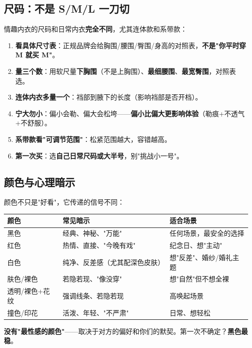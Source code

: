 \documentclass[12pt,UTF8,openany]{ctexbook}
\begin{document}
\subsection*{尺码：不是 S/M/L 一刀切}
情趣内衣的尺码和日常内衣\textbf{完全不同}，尤其连体款和系带款：
\begin{enumerate}[leftmargin=2em,itemsep=0.2em]
  \item \textbf{看具体尺寸表}：正规品牌会给胸围/腰围/臀围/身高的对照表，\textbf{不是"你平时穿 M 就买 M"}。
  \item \textbf{量三个数}：用软尺量\textbf{下胸围}（不是上胸围）、\textbf{最细腰围}、\textbf{最宽臀围}，对照表选。
  \item \textbf{连体内衣多量一个}：裆部到腋下的长度（影响裆部是否开档）。
  \item \textbf{宁大勿小}：偏小会勒、偏大会松垮——\textbf{偏小比偏大更影响体验}（勒痕+不透气+不舒服）。
  \item \textbf{系带款看"可调节范围"}：松紧范围越大，容错越高。
  \item \textbf{第一次买}：选\textbf{自己日常尺码或大半号}，别"挑战小一号"。
\end{enumerate}

\subsection*{颜色与心理暗示}
颜色不只是"好看"，它传递的信号不同：
\begin{tabularx}{\textwidth}{X X X}
\toprule
\textbf{颜色} & \textbf{常见暗示} & \textbf{适合场景} \\
\midrule
黑色 & 经典、神秘、"万能" & 任何场景，最安全的选择 \\
红色 & 热情、直接、"今晚有戏" & 纪念日、想"主动" \\
白色 & 纯净、反差感（尤其配深色皮肤） & 想"反差"、婚纱/婚礼主题 \\
肤色/裸色 & 若隐若现、"像没穿" & 想"自然"但不想全裸 \\
透明/裸色+花纹 & 强调线条、若隐若现 & 高唤起场景 \\
撞色/印花 & 活泼、年轻、"不严肃" & 日常、想轻松 \\
\bottomrule
\end{tabularx}
\par\smallskip
\textbf{没有"最性感的颜色"}——取决于对方的偏好和你们的默契。第一次不确定？\textbf{黑色最稳}。
\end{document}

